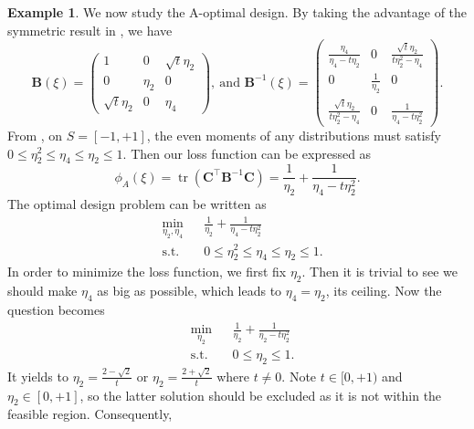 \documentclass[
]{book}
\theoremstyle{definition}
\theoremstyle{definition}
\newtheorem{example}{Example}[chapter]
\theoremstyle{definition}
\theoremstyle{definition}
\theoremstyle{remark}
\begin{document}
\begin{example}
We now study the A-optimal design. By taking the advantage of the symmetric result in \citet{yin2018optimal}, we have
\[
    \boldsymbol{B}(\xi)=
    \begin{pmatrix}
    1           &0      &\sqrt{t}\eta_2\\
    0           &\eta_2 &0  \\
    \sqrt{t}\eta_2 &    0   &   \eta_4
    \end{pmatrix},~\text{and }
    \boldsymbol{B}^{-1}(\xi)=\begin{pmatrix} 
        \frac{\eta_4}{\eta_4-t\eta_2}&0         &\frac{\sqrt{t}\eta_2}{t\eta_2^2-\eta_4}\\
        0       &\frac{1}{\eta_2}       &0\\
       \frac{\sqrt{t}\eta_2}{t\eta_2^2-\eta_4}&0&\frac{1}{\eta_4-t\eta_2^2} 
    \end{pmatrix}.
\]
From \citet{dette1997theory}, on \(S=[-1,+1]\), the even moments of any distributions must satisfy \(0\leq \eta_2^2 \leq \eta_4 \leq \eta_2 \leq 1\). Then our loss function can be expressed as
\[
  \phi_A(\xi)=\operatorname{tr}(\boldsymbol{C}^\top \boldsymbol{B}^{-1}\boldsymbol{C})= \frac{1}{\eta_2}+\frac{1}{\eta_4-t\eta_2^2}.
\]
The optimal design problem can be written as
\begin{equation*}
        \begin{aligned}
            & \underset{\eta_2,\eta_4}{\text{min}}
            & & \frac{1}{\eta_2}+\frac{1}{\eta_4-t\eta_2^2} \\
            & \text{s.t.}
            & & 0\leq \eta_2^2 \leq \eta_4 \leq \eta_2 \leq 1.
        \end{aligned}
    \end{equation*}
In order to minimize the loss function, we first fix \(\eta_2\). Then it is trivial to see we should make \(\eta_4\) as big as possible, which leads to \(\eta_4=\eta_2\), its ceiling. Now the question becomes
\begin{equation*}
        \begin{aligned}
            & \underset{\eta_2}{\text{min}}
            & & \frac{1}{\eta_2}+\frac{1}{\eta_2-t\eta_2^2} \\
            & \text{s.t.}
            & & 0\leq  \eta_2 \leq 1.
        \end{aligned}
    \end{equation*}
It yields to \(\eta_2=\frac{2-\sqrt{2}}{t}\) or \(\eta_2=\frac{2+\sqrt{2}}{t}\) where \(t\ne 0\). Note \(t\in[0,+1)\) and \(\eta_2\in[0,+1]\), so the latter solution should be excluded as it is not within the feasible region. Consequently,

\end{example}
\end{document}
